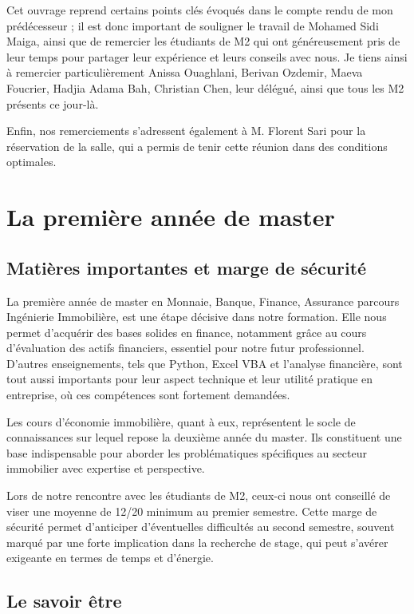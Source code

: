 \documentclass[a4paper, 12pt]{report}
\begin{document}
Cet ouvrage reprend certains points clés évoqués dans le compte rendu de mon prédécesseur ; il est donc important de souligner le travail de Mohamed Sidi Maiga, ainsi que de remercier les étudiants de M2 qui ont généreusement pris de leur temps pour partager leur expérience et leurs conseils avec nous. Je tiens ainsi à remercier particulièrement Anissa Ouaghlani, Berivan Ozdemir, Maeva Foucrier, Hadjia Adama Bah, Christian Chen, leur délégué, ainsi que tous les M2 présents ce jour-là.

Enfin, nos remerciements s’adressent également à M. Florent Sari pour la réservation de la salle, qui a permis de tenir cette réunion dans des conditions optimales.

\chapter{La première année de master}

\section{Matières importantes et marge de sécurité}

La première année de master en Monnaie, Banque, Finance, Assurance parcours Ingénierie Immobilière, est une étape décisive dans notre formation. Elle nous permet d’acquérir des bases solides en finance, notamment grâce au cours d’évaluation des actifs financiers, essentiel pour notre futur professionnel. D’autres enseignements, tels que Python, Excel VBA et l’analyse financière, sont tout aussi importants pour leur aspect technique et leur utilité pratique en entreprise, où ces compétences sont fortement demandées.

Les cours d’économie immobilière, quant à eux, représentent le socle de connaissances sur lequel repose la deuxième année du master. Ils constituent une base indispensable pour aborder les problématiques spécifiques au secteur immobilier avec expertise et perspective.

Lors de notre rencontre avec les étudiants de M2, ceux-ci nous ont conseillé de viser une moyenne de 12/20 minimum au premier semestre. Cette marge de sécurité permet d’anticiper d’éventuelles difficultés au second semestre, souvent marqué par une forte implication dans la recherche de stage, qui peut s’avérer exigeante en termes de temps et d’énergie. 

\section{Le savoir être}
\end{document}
